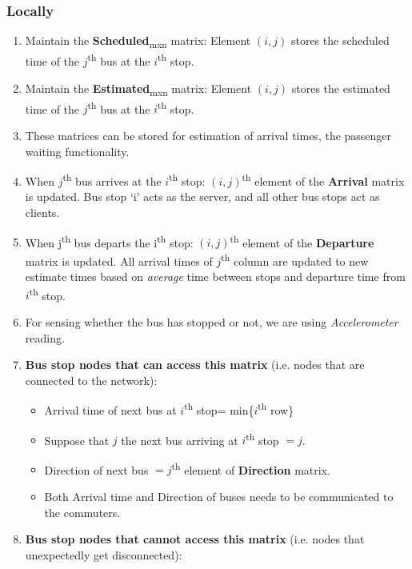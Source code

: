 \subsubsection{Locally}

\begin{enumerate}

\item Maintain the \textbf{Scheduled}\textsubscript{mxn} matrix: Element $(i, j)$ stores the scheduled time of the $j$\textsuperscript{th} bus at the $i$\textsuperscript{th} stop.
\item Maintain the \textbf{Estimated}\textsubscript{mxn} matrix: Element $(i, j)$ stores the estimated time of the $j$\textsuperscript{th} bus at the $i$\textsuperscript{th} stop.
\item These matrices can be stored for estimation of arrival times, the passenger waiting functionality.
\item When $j$\textsuperscript{th} bus arrives at the $i$\textsuperscript{th} stop: $(i, j)$\textsuperscript{th} element of the \textbf{Arrival} matrix is updated. Bus stop `i' acts as the server, and all other bus stops act as clients.
\item When j\textsuperscript{th} bus departs the i\textsuperscript{th} stop: $(i, j)$\textsuperscript{th} element of the \textbf{Departure} matrix is updated. All arrival times of $j$\textsuperscript{th} column are updated to new estimate times based on \textit{average} time between stops and departure time from $i$\textsuperscript{th} stop.
\item For sensing whether the bus has stopped or not, we are using \textit{Accelerometer} reading.
\item \textbf{Bus stop nodes that can access this matrix} (i.e. nodes that are connected to the network):
\begin{itemize}
\item Arrival time of next bus at $i$\textsuperscript{th} stop= min\{$i$\textsuperscript{th} row\}
\item Suppose that $j$ the next bus arriving at $i$\textsuperscript{th} stop $= j$.
\item Direction of next bus $= j$\textsuperscript{th} element of \textbf{Direction} matrix.
\item Both Arrival time and Direction of buses needs to be communicated to the commuters.
\end{itemize}
\item \textbf{Bus stop nodes that cannot access this matrix} (i.e. nodes that unexpectedly get disconnected):

\end{enumerate}
